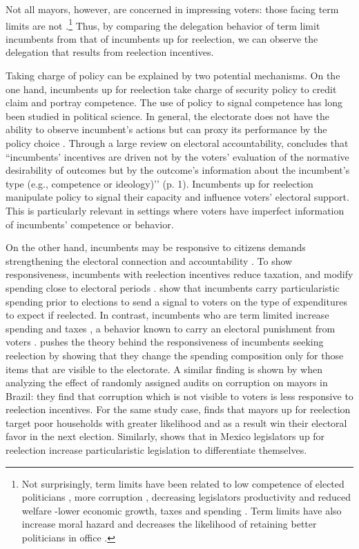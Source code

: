 \documentclass[12pt]{amsart}
\numberwithin{equation}{section}
\theoremstyle{definition}
\theoremstyle{definition}
\theoremstyle{definition}
\begin{document}
Not all mayors, however, are concerned in impressing voters: those facing term limits are not \citep{ashworth_2012}.\footnote{Not surprisingly, term limits have been related to low competence of elected politicians \citep{dalbo_etal_2017}, more corruption \citep{ferraz_finan_2011}, decreasing legislators productivity \citep{hall_etal_2018} and reduced welfare -lower economic growth, taxes and spending \citep{alt_etal_2011}. Term limits have also increase moral hazard and decreases the likelihood of retaining better politicians in office \citep{smart_sturm_2013}.} Thus, by comparing the delegation behavior of term limit incumbents from that of incumbents up for reelection, we can observe the delegation that results from reelection incentives. 

Taking charge of policy can be explained by two potential mechanisms. On the one hand, incumbents up for reelection take charge of security policy to credit claim and portray competence. The use of policy to signal competence has long been studied in political science. In general, the electorate does not have the ability to observe incumbent’s actions but can proxy its performance by the policy choice \citep{ferejohn_1986}. Through a large review on electoral accountability, \citet{ashworth_2012} concludes that ``incumbents’ incentives are driven not by the voters’ evaluation of the normative desirability of outcomes but by the outcome’s information about the incumbent’s type (e.g., competence or ideology)’’ (p. 1). Incumbents up for reelection manipulate policy to signal their capacity and influence voters’ electoral support. This is particularly relevant in settings where voters have imperfect information of incumbents’ competence or behavior.

On the other hand, incumbents may be responsive to citizens demands strengthening the electoral connection and accountability \citep{mayhew_1974, manin_etal_1999, cox_katz_2002}. To show responsiveness, incumbents with reelection incentives reduce taxation, and modify spending close to electoral periods \citep{Rogoff_1988, Rogoff_1990, klein_sakurai_2015}. \citet{Drazen_eslava_2005} show that incumbents carry particularistic spending prior to elections to send a signal to voters on the type of expenditures to expect if reelected. In contrast, incumbents who are term limited increase spending and taxes \citep{Besley_case_1995}, a behavior known to carry an electoral punishment from voters \citep{peltzman_1992}. \citet{akhmedov_2004} pushes the theory behind the responsiveness of incumbents seeking reelection by showing that they change the spending composition only for those items that are visible to the electorate. A similar finding is shown by \citet{ferraz_finan_2011} when analyzing the effect of randomly assigned audits on corruption on mayors in Brazil: they find that corruption which is not visible to voters is less responsive to reelection incentives. For the same study case, \citet{frey_2021} finds that mayors up for reelection target poor households with greater likelihood and as a result win their electoral favor in the next election. Similarly, \citet{motolinia_2020} shows that in Mexico legislators up for reelection increase particularistic legislation to differentiate themselves. 
\end{document}
